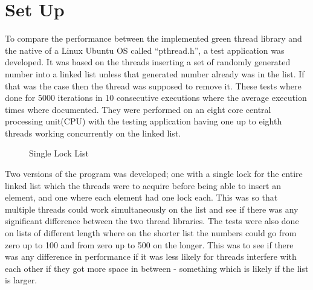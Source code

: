 \documentclass{article}
\begin{document}
\section{Set Up}\label{setup}

To compare the performance between the implemented green thread library and the native of a Linux Ubuntu OS called “pthread.h”, a test application was developed. It was based on the threads inserting a set of randomly generated number into a linked list unless that generated number already was in the list. If that was the case then the thread was supposed to remove it. These tests where done for 5000 iterations in 10 consecutive executions where the average execution times where documented. They were performed on an eight core central processing unit(CPU) with the testing application having one up to eighth threads working concurrently on the linked list. 

\begin{figure}
\hspace{4em}
\caption{Single Lock List}
\end{figure}


Two versions of the program was developed; one with a single lock for the entire linked list which the threads were to acquire before being able to insert an element, and one where each element had one lock each. This was so that multiple threads could work simultaneously on the list and see if there was any significant difference between the two thread libraries. 
The tests were also done on lists of different length where on the shorter list the numbers could go from zero up to 100 and from zero up to 500 on the longer. This was to see if there was any difference in performance if it was less likely for threads interfere with each other if they got more space in between - something which is likely if the list is larger. 
\end{document}
